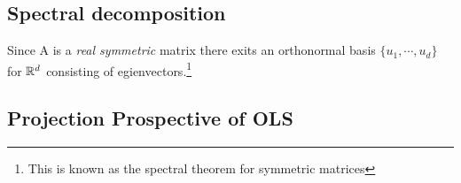 \subsection{Spectral decomposition}
Since A is a \textit{real symmetric} matrix there exits an orthonormal basis $\{u_1, \cdots, u_d\}$ for $\mathbb R^d$ consisting of egienvectors.\footnote{This is known as the spectral theorem for symmetric matrices}
\subsection{Projection Prospective of OLS}
